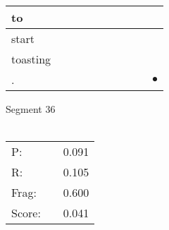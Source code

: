 \documentclass[landscape]{article}
\newcommand{\ssp}{\hspace{2pt}}
\newcommand{\mex}{\cellcolor{g}$\bullet$}
\begin{document}
\begin{tabular}{|l|p{10pt}|p{10pt}|p{10pt}|p{10pt}|p{10pt}|p{10pt}|p{10pt}|p{10pt}|p{10pt}|}
\hline
\ssp to \ssp&\hspace{2pt}&\hspace{2pt}&\hspace{2pt}&\hspace{2pt}&\hspace{2pt}&\hspace{2pt}&\hspace{2pt}&\hspace{2pt}&\hspace{2pt}\\
\hline
\ssp start \ssp&\hspace{2pt}&\hspace{2pt}&\hspace{2pt}&\hspace{2pt}&\hspace{2pt}&\hspace{2pt}&\hspace{2pt}&\hspace{2pt}&\hspace{2pt}\\
\hline
\ssp toasting \ssp&\hspace{2pt}&\hspace{2pt}&\hspace{2pt}&\hspace{2pt}&\hspace{2pt}&\hspace{2pt}&\hspace{2pt}&\hspace{2pt}&\hspace{2pt}\\
\hline
\ssp \cellcolor{ref8}. \ssp&\hspace{2pt}&\hspace{2pt}&\hspace{2pt}&\hspace{2pt}&\hspace{2pt}&\hspace{2pt}&\hspace{2pt}&\hspace{2pt}&\hspace{2pt}\mex\\
\hline
\end{tabular}

\vspace{6pt}
\noindent Segment 36\\\\
\noindent\begin{tabular}{lm{12pt}r}
\hline
P:&&0.091\\
R:&&0.105\\
Frag:&&0.600\\
Score:&&0.041\\
\end{tabular}
\end{document}
